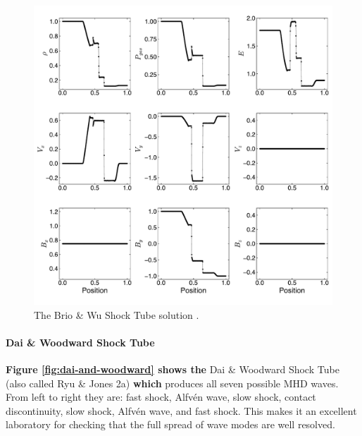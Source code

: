 \documentclass[modern, linenumbers]{aastex631}
\newcommand*{\img}[1]{%
    \raisebox{-.05\baselineskip}{%
        \texttt{[image: \#1]}%
    }%
}
\begin{document}
\begin{figure}[ht!]
    \includegraphics[width=\linewidth]{b-and-w.pdf}
    \caption{The Brio \& Wu Shock Tube solution \citep{brio_wu_1988}.
    \href{https://zenodo.org/records/10927223}{\img{zenodo-gradient-200.png}}}
    \label{fig:brio-and-wu}
\end{figure}

\paragraph{Dai \& Woodward Shock Tube}
\textbf{Figure \ref{fig:dai-and-woodward} shows the} Dai \& Woodward Shock Tube (also called Ryu \& Jones 2a) \citep{dai_woodward_1998, ryu_jones_1995} \textbf{which} produces all seven possible MHD waves. From left to right they are: fast shock, Alfvén wave, slow shock, contact discontinuity, slow shock, Alfvén wave, and fast shock. This makes it an excellent laboratory for checking that the full spread of wave modes are well resolved.
\end{document}
